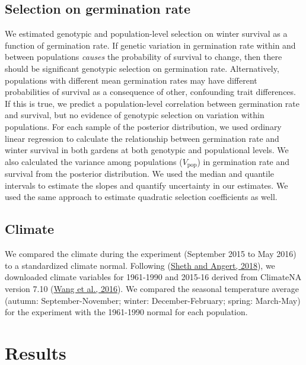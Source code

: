 \documentclass[
  12pt,
]{article}
\begin{document}
\hypertarget{selection-on-germination-rate}{%
\subsection{Selection on germination rate}\label{selection-on-germination-rate}}

We estimated genotypic and population-level selection on winter survival as a function of germination rate. If genetic variation in germination rate within and between populations \emph{causes} the probability of survival to change, then there should be significant genotypic selection on germination rate. Alternatively, populations with different mean germination rates may have different probabilities of survival as a consequence of other, confounding trait differences. If this is true, we predict a population-level correlation between germination rate and survival, but no evidence of genotypic selection on variation within populations. For each sample of the posterior distribution, we used ordinary linear regression to calculate the relationship between germination rate and winter survival in both gardens at both genotypic and populational levels. We also calculated the variance among populations (\(V_\text{pop}\)) in germination rate and survival from the posterior distribution. We used the median and quantile intervals to estimate the slopes and quantify uncertainty in our estimates. We used the same approach to estimate quadratic selection coefficients as well.

\hypertarget{climate}{%
\subsection{Climate}\label{climate}}

We compared the climate during the experiment (September 2015 to May 2016) to a standardized climate normal. Following (\protect\hyperlink{ref-sheth_demographic_2018}{Sheth and Angert, 2018}), we downloaded climate variables for 1961-1990 and 2015-16 derived from ClimateNA version 7.10 (\protect\hyperlink{ref-wang_locally_2016}{Wang et al., 2016}). We compared the seasonal temperature average (autumn: September-November; winter: December-February; spring: March-May) for the experiment with the 1961-1990 normal for each population.

\hypertarget{results}{%
\section{Results}\label{results}}
\end{document}
